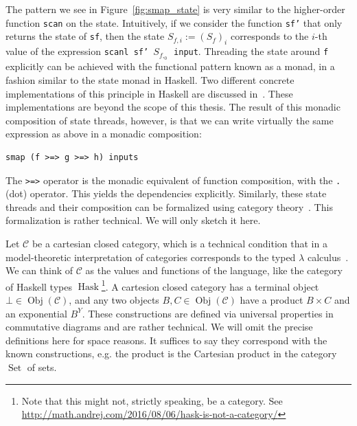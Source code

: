 The pattern we see in Figure~\ref{fig:smap_state} is very similar to the higher-order function \texttt{scan} on the state.
Intuitively, if we consider the function \texttt{sf'} that only returns the state of \texttt{sf}, then the state $S_{f,i} := (S_f)_i$ corresponds to the $i$-th value of the expression \texttt{scanl sf' $S_{f,_0}$ input}.
Threading the state around \texttt{f} explicitly can be achieved with the functional pattern known as a monad, in a fashion similar to the state monad in Haskell. 
Two different concrete implementations of this principle in Haskell are discussed in~\cite{ertel_haskell19}. These implementations are beyond the scope of this thesis.
The result of this monadic composition of state threads, however, is that we can write virtually the same expression as above in a monadic composition:

\begin{verbatim}
smap (f >=> g >=> h) inputs
\end{verbatim}

The \texttt{>=>} operator is the monadic equivalent of function composition, with the \texttt{.} (dot) operator. This yields the dependencies explicitly.
Similarly, these state threads and their composition can be formalized using category theory~\cite{ertel_haskellsup19}.
This formalization is rather technical. We will only sketch it here.

Let $\mathcal{C}$ be a cartesian closed category, which is a technical condition that in a model-theoretic interpretation of categories corresponds to the typed $\lambda$ calculus~\cite{huet1985cartesian}.
We can think of $\mathcal{C}$ as the values and functions of the language, like the category of Haskell types $\operatorname{Hask}$\footnote{Note that this might not, strictly speaking, be a category. See \url{http://math.andrej.com/2016/08/06/hask-is-not-a-category/}}.
A cartesion closed category has a terminal object $\bot \in \operatorname{Obj}(\mathcal{C})$, and any two objects $B,C \in \operatorname{Obj}(\mathcal{C})$ have a product $B \times C$ and an exponential $B^Y$.
These constructions are defined via universal properties in commutative diagrams and are rather technical.
We will omit the precise definitions here for space reasons.
It suffices to say they correspond with the known constructions, e.g. the product is the Cartesian product in the category $\operatorname{Set}$ of sets. 

